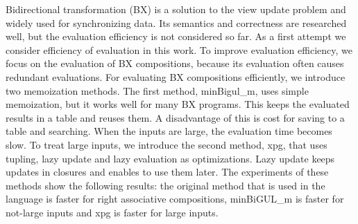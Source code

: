  Bidirectional transformation (BX) is a solution to the view update problem and widely used for synchronizing data. Its semantics and correctness are researched well, but the evaluation efficiency is not considered so far. As a first attempt we consider efficiency of evaluation in this work. To improve evaluation efficiency, we focus on the evaluation of BX compositions, because its evaluation often causes redundant evaluations. 
 For evaluating BX compositions efficiently, we introduce two memoization methods. The first method, minBigul\_m, uses simple memoization, but it works well for many BX programs. This keeps the evaluated results in a table and reuses them.  A disadvantage of this is cost for saving to a table and searching. When the inputs are large, the evaluation time becomes slow. To treat large inputs, we introduce the second method, xpg, that uses tupling, lazy update and lazy evaluation as optimizations. Lazy update keeps updates in closures and enables to use them later.
 The experiments of these methods show the following results: the original method that is used in the language is faster for right associative compositions, minBiGUL\_m is faster for not-large inputs and xpg is faster for large inputs.

